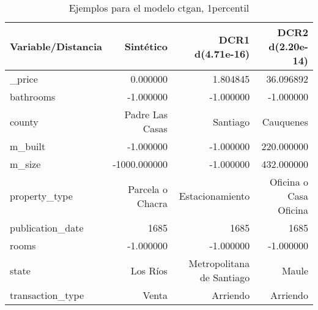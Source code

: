 \begin{table}[H]
\centering
\fontsize{10}{14}\selectfont
\caption{Ejemplos para el modelo ctgan, 1percentil}
\label{table-example-economicos-b-2-ctgan-1p}
\begin{tabular}{|l|r|r|r|}
\hline
\rowcolor[gray]{0.8}
Variable/Distancia & Sintético & DCR1 d(4.71e-16) & DCR2 d(2.20e-14) \\
\hline \_price & \cellcolor[rgb]{0.9, 0.54, 0.52} 0.000000 & 1.804845 & 36.096892 \\
\hline bathrooms & \cellcolor[rgb]{0.9, 0.54, 0.52} -1.000000 & \cellcolor[rgb]{0.9, 0.54, 0.52} -1.000000 & \cellcolor[rgb]{0.9, 0.54, 0.52} -1.000000 \\
\hline county & \cellcolor[rgb]{0.9, 0.54, 0.52} Padre Las Casas & Santiago & Cauquenes \\
\hline m\_built & \cellcolor[rgb]{0.9, 0.54, 0.52} -1.000000 & \cellcolor[rgb]{0.9, 0.54, 0.52} -1.000000 & 220.000000 \\
\hline m\_size & \cellcolor[rgb]{0.9, 0.54, 0.52} -1000.000000 & \cellcolor[rgb]{0.9, 0.54, 0.52} -1.000000 & 432.000000 \\
\hline property\_type & \cellcolor[rgb]{0.9, 0.54, 0.52} Parcela o Chacra & Estacionamiento & Oficina o Casa Oficina \\
\hline publication\_date & \cellcolor[rgb]{0.9, 0.54, 0.52} 1685 & \cellcolor[rgb]{0.9, 0.54, 0.52} 1685 & \cellcolor[rgb]{0.9, 0.54, 0.52} 1685 \\
\hline rooms & \cellcolor[rgb]{0.9, 0.54, 0.52} -1.000000 & \cellcolor[rgb]{0.9, 0.54, 0.52} -1.000000 & \cellcolor[rgb]{0.9, 0.54, 0.52} -1.000000 \\
\hline state & \cellcolor[rgb]{0.9, 0.54, 0.52} Los Ríos & Metropolitana de Santiago & Maule \\
\hline transaction\_type & \cellcolor[rgb]{0.9, 0.54, 0.52} Venta & Arriendo & Arriendo \\
\hline
\end{tabular}
\end{table}

